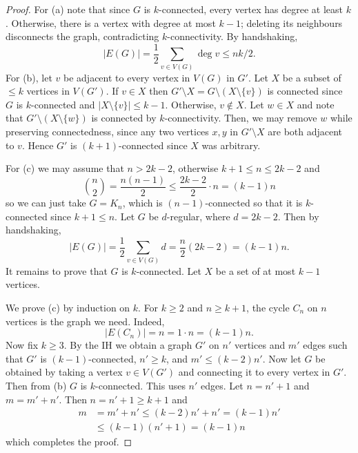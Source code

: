 \begin{proof}
	For (a) note that since \( G \) is \( k \)-connected, every vertex has degree at least \( k \). Otherwise, there is a vertex with degree at most \( k - 1 \); deleting its neighbours disconnects the graph, contradicting \( k \)-connectivity. By handshaking, \[|E(G)| = \frac{1}{2}  \sum_{v \in V(G)}^{} \deg v \leq nk/2.  \] For (b), let \( v \) be adjacent to every vertex in \( V(G) \) in \( G' \). Let \( X \) be a subset of \( \leq k \) vertices in \( V(G') \). If \( v \in X \) then \( G'\setminus X = G \setminus (X \setminus \{ v \} ) \) is connected since \( G \) is \( k \)-connected and \( |X \setminus \{ v \} | \leq k - 1 \). Otherwise, \( v \notin X \). Let \( w \in X \) and note that \( G' \setminus (X \setminus \{ w \} ) \) is connected by \( k \)-connectivity. Then, we may remove \( w \) while preserving connectedness, since any two vertices \( x,y \) in \( G' \setminus X \) are both adjacent to \( v \). Hence \( G' \) is \( (k+1) \)-connected since \( X \) was arbitrary.

	For (c) we may assume that \( n > 2k - 2 \), otherwise \( k+1 \leq n \leq 2k - 2 \) and \[\binom{n}{2} = \frac{n(n-1)}{2} \leq \frac{2k-2}{2} \cdot n = (k-1)n  \] so we can just take \( G = K_{n}  \), which is \( (n-1) \)-connected so that it is \( k \)-connected since \( k+1 \leq n \). Let \( G \) be \( d \)-regular, where \( d = 2k - 2 \). Then by handshaking, \[ |E(G)| = \frac{1}{2} \sum_{v \in V(G)}^{} d = \frac{n}{2} (2k-2) = (k-1)n. \] It remains to prove that \( G \) is \( k \)-connected. Let \( X \) be a set of at most \( k - 1 \) vertices.

	We prove (c) by induction on \( k \). For \( k \geq 2 \) and \( n \geq k + 1 \), the cycle \( C_{n}  \) on \( n \) vertices is the graph we need. Indeed, \[ |E(C_{n})| = n = 1 \cdot n = (k-1)n. \] Now fix \( k\geq 3 \). By the IH we obtain a graph \( G' \) on \( n' \) vertices and \( m' \) edges such that \( G' \) is \( (k-1) \)-connected, \( n' \geq k \), and \( m' \leq (k - 2)n' \). Now let \( G \) be obtained by taking a vertex \( v \in V(G') \) and connecting it to every vertex in \( G' \). Then from (b) \( G \) is \( k \)-connected. This uses \( n' \) edges. Let \( n = n' + 1 \) and \( m = m' + n' \). Then \( n = n' + 1 \geq k + 1 \) and
	\begin{align*}
		m &= m' + n' \leq (k-2)n' + n' = (k-1)n' \\ 
		  &\leq (k-1)(n' + 1) = (k-1)n
	\end{align*}
which completes the proof.
\end{proof}
